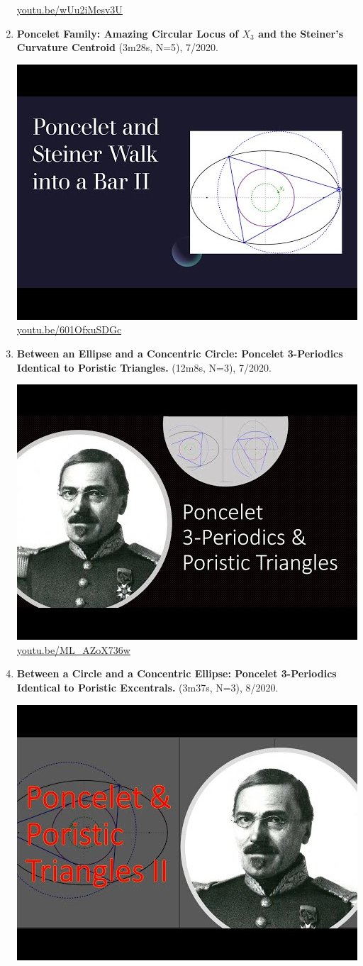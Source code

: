 \documentclass[12pt]{amsart}
\begin{document}
\begin{enumerate}[resume]
\begin{center}
\href{https://youtu.be/wUu2iMesv3U}{\url{youtu.be/wUu2iMesv3U}}\end{center}
% 
\item \textbf{Poncelet Family: Amazing Circular Locus of $X_{3}$ and the Steiner's Curvature Centroid} (3m28s, N=5), 7/2020. 
\begin{center}\includegraphics[width=.5\textwidth]{pics/601OfxuSDGc.jpg} \\ 
\href{https://youtu.be/601OfxuSDGc}{\url{youtu.be/601OfxuSDGc}}\end{center}
% 
\item \textbf{Between an Ellipse and a Concentric Circle: Poncelet 3-Periodics Identical to Poristic Triangles.} (12m8s, N=3), 7/2020. 
\begin{center}\includegraphics[width=.5\textwidth]{pics/ML_AZoX736w.jpg} \\ 
\href{https://youtu.be/ML_AZoX736w}{\url{youtu.be/ML\_AZoX736w}}\end{center}
% 
\item \textbf{Between a Circle and a Concentric Ellipse: Poncelet 3-Periodics Identical to Poristic Excentrals.} (3m37s, N=3), 8/2020. 
\begin{center}\includegraphics[width=.5\textwidth]{pics/xM1SAZO9bDc.jpg} \\ 

\end{center}
\end{enumerate}
\end{document}
